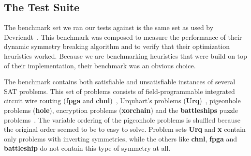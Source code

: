 \subsection{The Test Suite}
\label{ssec:benchmark}
	The benchmark set we ran our tests against is the same set as used by Devriendt~\cite{devriendt2012symmetry}.
	This benchmark was composed to measure the performance of their dynamic symmetry
	breaking algorithm and to verify that their optimization heuristics worked.
	Because we are benchmarking heuristics that were build on top of their implementation, their
	benchmark was an obvious choice.

	The benchmark contains both satisfiable and unsatisfiable instances of several SAT problems.
	This set of problems consists of field-programmable integrated circuit wire routing (\textbf{fpga} and 
	\textbf{chnl})~\cite{nam2004comparative}, Urquhart's problems (\textbf{Urq})~\cite{urquhart1987hard},
	pigeonhole problems (\textbf{hole}), encryption problems (\textbf{xorchain}) and the \textbf{battleships} 
	puzzle problems~\cite{sevenster2004battleships}.
	The variable ordering of the pigeonhole problems is shuffled because the original order seemed to be
	to easy to solve.
	Problem sets \textbf{Urq} and \textbf{x} contain only problems with inverting symmetries, while the
	others like \textbf{chnl}, \textbf{fpga} and \textbf{battleship} do not contain this type of symmetry
	at all.
